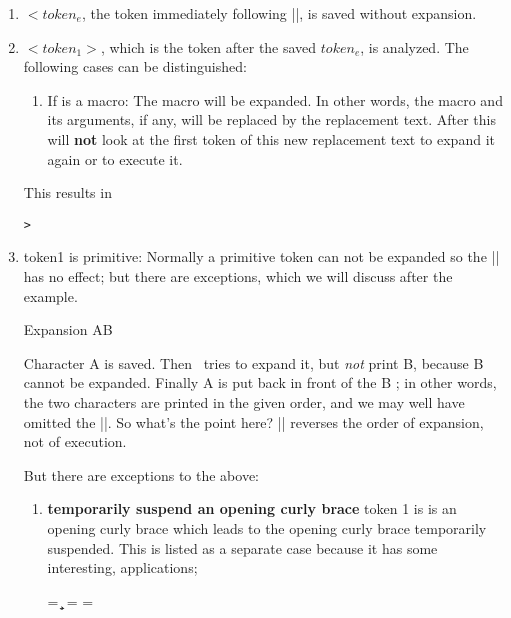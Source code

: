 \begin{enumerate}
\item  $<token_e$, the token immediately following |\expandafter|, is saved without expansion.
\item $<token_1>$, which is the token after the saved $token_e$, is analyzed. The following cases can be distinguished:
\begin{enumerate}
\item If is a macro: The macro will be expanded. In other words, the macro and its arguments, if any, will be replaced by the replacement text. After this \tex will \textbf{not} look at the first token of this new replacement text to expand it again or to execute it.
\end{enumerate}



\begin{teX}
\def\xx [#1]{[#1]}
\def\yy{[ABC]}

\expandafter\xx\yy
\end{teX}

This results in 
\def\xx [#1]{[#1]}
\def\yy{[ABC]}

\texttt{> \expandafter\xx\yy}


\item token1 is primitive: Normally a primitive token can not be expanded so the |\expandafter| has no effect; but there are exceptions, which we will discuss after the example.

\begin{texexample}{Expansion}{}
\expandafter AB
\end{texexample}

Character A is saved. Then \tex\ tries to expand it, but \textit{not} print B, because B cannot be expanded. Finally A is put back in front of the B ; in other words, the two characters are printed in the given order, and we may well have omitted the |\expandafter|. So what's the point here? |\expandafter| reverses the order of expansion, not of execution.

\noindent But there are exceptions to the above:
\begin{enumerate}
\item \textbf{temporarily suspend an opening curly brace} token 1 is is an opening curly brace which leads to the opening curly brace temporarily suspended. This is listed as a separate case because it has some interesting, applications;

\begin{teX}
\newtoks\ta
\newtoks\tb
\ta = {\a\b\c}
\tb=\expandafter{\the\ta}
\tb={\the\ta}
\tb
\end{teX}


\end{enumerate}
\end{enumerate}
